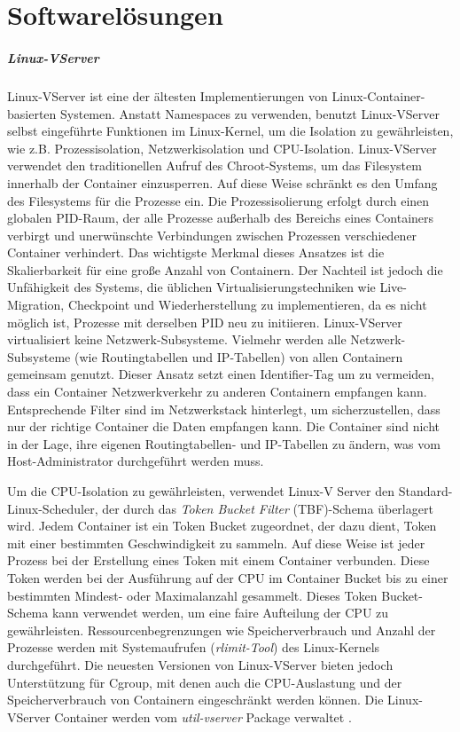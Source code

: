 \thispagestyle{empty}

\section{Softwarelösungen}

\subparagraph{Linux-VServer}
Linux-VServer ist eine der ältesten Implementierungen von Linux-Container-basierten Systemen. Anstatt Namespaces zu verwenden, benutzt Linux-VServer selbst eingeführte Funktionen im Linux-Kernel, um die Isolation zu gewährleisten, wie z.B. Prozessisolation, Netzwerkisolation und CPU-Isolation. Linux-VServer verwendet den traditionellen Aufruf des Chroot-Systems, um das Filesystem innerhalb der Container einzusperren. Auf diese Weise schränkt es den Umfang des Filesystems für die Prozesse ein. Die Prozessisolierung erfolgt durch einen globalen PID-Raum, der alle Prozesse außerhalb des Bereichs eines Containers verbirgt und unerwünschte Verbindungen zwischen Prozessen verschiedener Container verhindert. Das wichtigste Merkmal dieses Ansatzes ist die Skalierbarkeit für eine große Anzahl von Containern. Der Nachteil ist jedoch die Unfähigkeit des Systems, die üblichen Virtualisierungstechniken wie Live-Migration, Checkpoint und Wiederherstellung zu implementieren, da es nicht möglich ist, Prozesse mit derselben PID neu zu initiieren. Linux-VServer virtualisiert keine Netzwerk-Subsysteme. Vielmehr werden alle Netzwerk-Subsysteme (wie Routingtabellen und IP-Tabellen) von allen Containern gemeinsam genutzt. Dieser Ansatz setzt einen Identifier-Tag um zu vermeiden, dass ein Container Netzwerkverkehr zu anderen Containern empfangen kann. Entsprechende Filter sind im Netzwerkstack hinterlegt, um sicherzustellen, dass nur der richtige Container die Daten empfangen kann. Die Container sind nicht in der Lage, ihre eigenen Routingtabellen- und IP-Tabellen zu ändern, was vom Host-Administrator durchgeführt werden muss. 

Um die CPU-Isolation zu gewährleisten, verwendet Linux-V Server den Standard-Linux-Scheduler, der durch das \emph{Token Bucket Filter} (TBF)-Schema überlagert wird. Jedem Container ist ein Token Bucket zugeordnet, der dazu dient, Token mit einer bestimmten Geschwindigkeit zu sammeln. Auf diese Weise ist jeder Prozess bei der Erstellung eines Token mit einem Container verbunden. Diese Token werden bei der Ausführung auf der CPU im Container Bucket bis zu einer bestimmten Mindest- oder Maximalanzahl gesammelt. Dieses Token Bucket-Schema kann verwendet werden, um eine faire Aufteilung der CPU zu gewährleisten. Ressourcenbegrenzungen wie Speicherverbrauch und Anzahl der Prozesse werden mit Systemaufrufen (\emph{rlimit-Tool}) des Linux-Kernels durchgeführt. Die neuesten Versionen von Linux-VServer bieten jedoch Unterstützung für Cgroup, mit denen auch die CPU-Auslastung und der Speicherverbrauch von Containern eingeschränkt werden können. Die Linux-VServer Container werden vom \emph{util-vserver} \cite{Optionen2018Userspace-WerkzeugeLinux-VServer} Package verwaltet \cite{Overview2018PaperLinux-VServer} \cite{Xavier2015AClouds}.


